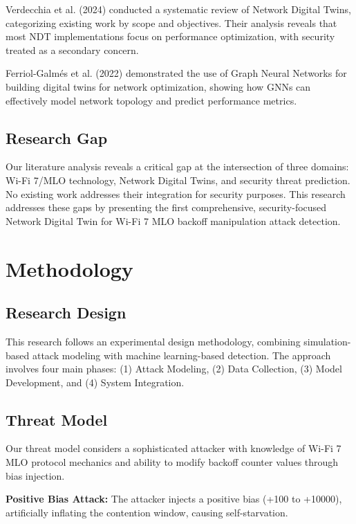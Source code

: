 \documentclass[12pt,a4paper]{article}
\begin{document}
Verdecchia et al. (2024) conducted a systematic review of Network Digital Twins, categorizing existing work by scope and objectives. Their analysis reveals that most NDT implementations focus on performance optimization, with security treated as a secondary concern.

Ferriol-Galmés et al. (2022) demonstrated the use of Graph Neural Networks for building digital twins for network optimization, showing how GNNs can effectively model network topology and predict performance metrics.

\subsection{Research Gap}

Our literature analysis reveals a critical gap at the intersection of three domains: Wi-Fi 7/MLO technology, Network Digital Twins, and security threat prediction. No existing work addresses their integration for security purposes. This research addresses these gaps by presenting the first comprehensive, security-focused Network Digital Twin for Wi-Fi 7 MLO backoff manipulation attack detection.

\section{Methodology}

\subsection{Research Design}

This research follows an experimental design methodology, combining simulation-based attack modeling with machine learning-based detection. The approach involves four main phases: (1) Attack Modeling, (2) Data Collection, (3) Model Development, and (4) System Integration.

\subsection{Threat Model}

Our threat model considers a sophisticated attacker with knowledge of Wi-Fi 7 MLO protocol mechanics and ability to modify backoff counter values through bias injection.

\textbf{Positive Bias Attack:} The attacker injects a positive bias (+100 to +10000), artificially inflating the contention window, causing self-starvation.
\end{document}

